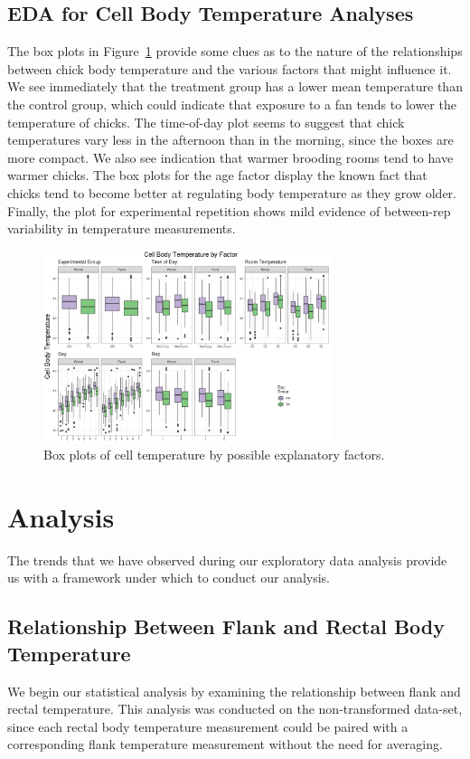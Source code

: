 \documentclass[a4paper, 10pt, titlepage]{article}
\begin{document}
\subsection{EDA for Cell Body Temperature Analyses}
The box plots in Figure~\ref{figure:factor boxplots} provide some clues as to the nature of the relationships between chick body temperature and the various factors that might influence it. We see immediately that the treatment group has a lower mean temperature than the control group, which could indicate that exposure to a fan tends to lower the temperature of chicks. The time-of-day plot seems to suggest that chick temperatures vary less in the afternoon than in the morning, since the boxes are more compact. We also see indication that warmer brooding rooms tend to have warmer chicks. The box plots for the age factor display the known fact that chicks tend to become better at regulating body temperature as they grow older. Finally, the plot for experimental repetition shows mild evidence of between-rep variability in temperature measurements.

\begin{figure}[!h]
	\centering
		\includegraphics[width = 0.75\textwidth]{images/boxplots.png}
	\caption{Box plots of cell temperature by possible explanatory factors.}
	\label{figure:factor boxplots}
\end{figure}

\section{Analysis}
The trends that we have observed during our exploratory data analysis provide us with a framework under which to conduct our analysis.

\subsection{Relationship Between Flank and Rectal Body Temperature}
	We begin our statistical analysis by examining the relationship between flank and rectal temperature. This analysis was conducted on the non-transformed data-set, since each rectal body temperature measurement could be paired with a corresponding flank temperature measurement without the need for averaging.
	
\end{document}
